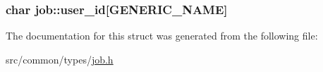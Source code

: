 \subsubsection[{\texorpdfstring{user\+\_\+id}{user_id}}]{\setlength{\rightskip}{0pt plus 5cm}char job\+::user\+\_\+id\mbox{[}{\bf G\+E\+N\+E\+R\+I\+C\+\_\+\+N\+A\+ME}\mbox{]}}\hypertarget{structjob_a3321c44174e0b6e58dc7eb501946ec0a}{}\label{structjob_a3321c44174e0b6e58dc7eb501946ec0a}


The documentation for this struct was generated from the following file\+:\begin{DoxyCompactItemize}
\item 
src/common/types/\hyperlink{job_8h}{job.\+h}\end{DoxyCompactItemize}

